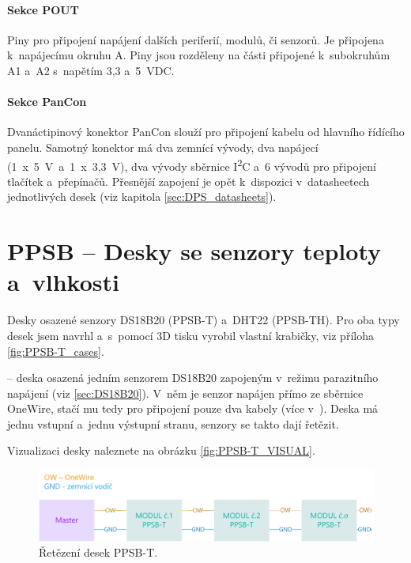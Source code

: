 \paragraph{Sekce POUT} 
Piny pro připojení napájení dalších periferií, modulů, či senzorů.
Je připojena k~napájecímu okruhu A.
Piny jsou rozděleny na části připojené k~subokruhům A1 a~A2 s~napětím 3,3 a~5~VDC.

\paragraph{Sekce PanCon}
Dvanáctipinový konektor PanCon slouží pro připojení kabelu od hlavního řídícího panelu. 
Samotný konektor má dva zemnící vývody, dva napájecí (1~x~5~V~a~1~x~3,3~V), dva vývody sběrnice I\textsuperscript{2}C a~6 vývodů pro připojení tlačítek a~přepínačů.
Přesnější zapojení je opět k~dispozici v~datasheetech jednotlivých desek (viz kapitola \ref{sec:DPS_datasheets}).

\section{PPSB -- Desky se senzory teploty a~vlhkosti}
Desky osazené senzory DS18B20\cite{DS18B20} (PPSB-T) a~DHT22\cite{DHT22} (PPSB-TH).
Pro oba typy desek jsem navrhl a~s~pomocí 3D tisku vyrobil vlastní krabičky, viz příloha \ref{fig:PPSB-T_cases}.\newline

\noindent{} -- deska osazená jedním senzorem DS18B20 \cite{DS18B20} zapojeným v~režimu parazitního napájení (viz \autoref{sec:DS18B20}).
V~něm je senzor napájen přímo ze sběrnice OneWire, stačí mu tedy pro připojení pouze dva kabely (více v~\cite{DS18B20}).
Deska má jednu vstupní a~jednu výstupní stranu, senzory se takto dají řetězit.

Vizualizaci desky naleznete na obrázku \ref{fig:PPSB-T_VISUAL}.\newline \newline

\begin{figure}[h]
    \centering
   \includegraphics[width=\textwidth]{img/HARDWARE/PPSB-T_CHAIN.png}
   \caption{Řetězení desek PPSB-T.}
   \label{fig:PPSB-T_wiring}
\end{figure}

